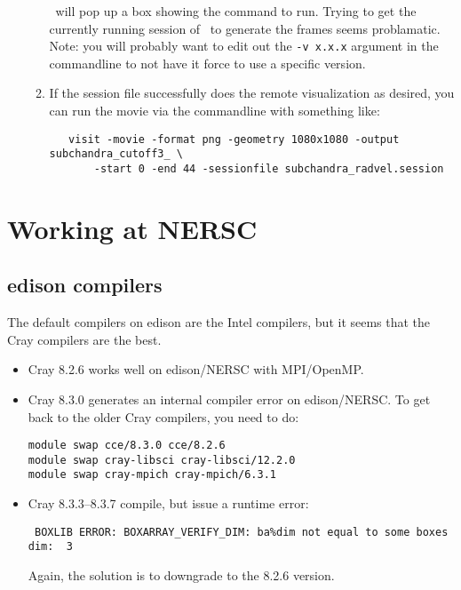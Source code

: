 \begin{itemize}
\begin{enumerate}
   \visit\ will pop up a box showing the command to run.  Trying to
   get the currently running session of \visit\ to generate the frames
   seems problamatic.  Note: you will probably want to edit out the
   {\tt -v x.x.x} argument in the commandline to not have it force
   to use a specific version.

  \item If the session file successfully does the remote visualization
   as desired, you can run the movie via the commandline with something like:

   \begin{verbatim}
   visit -movie -format png -geometry 1080x1080 -output subchandra_cutoff3_ \
       -start 0 -end 44 -sessionfile subchandra_radvel.session
   \end{verbatim}

  \end{enumerate}

\end{itemize}


\section{Working at NERSC}

\subsection{edison compilers}

The default compilers on edison are the Intel compilers, but
it seems that the Cray compilers are the best.

\begin{itemize}
\item Cray 8.2.6 works well on edison/NERSC with MPI/OpenMP.

\item Cray 8.3.0 generates an internal compiler error on edison/NERSC.
      To get back to the older Cray compilers, you need to do:

\begin{verbatim}
module swap cce/8.3.0 cce/8.2.6
module swap cray-libsci cray-libsci/12.2.0
module swap cray-mpich cray-mpich/6.3.1
\end{verbatim}

\item Cray 8.3.3--8.3.7 compile, but issue a runtime error:
\begin{verbatim}
 BOXLIB ERROR: BOXARRAY_VERIFY_DIM: ba%dim not equal to some boxes dim:  3
\end{verbatim}
Again, the solution is to downgrade to the 8.2.6 version.

\end{itemize}


